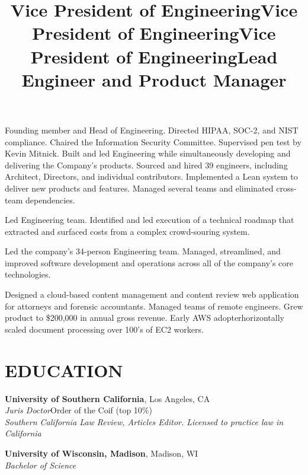 \documentclass[margin]{res}
\begin{document}
\begin{resume}
\title{\textbf{Vice President of Engineering}}
\begin{position}
\hspace*{.5cm}Founding member and Head of Engineering. Directed HIPAA, SOC-2, and NIST compliance. Chaired the Information Security Committee. Supervised pen test by Kevin Mitnick. Built and led Engineering while simultaneously developing and delivering the Company's products. Sourced and hired 39 engineers, including Architect, Directors, and individual contributors. Implemented a Lean system to deliver new products and features. Managed several teams and eliminated cross-team dependencies.
\end{position}

\title{\textbf{Vice President of Engineering}}
\begin{position}
\hspace*{.5cm}Led Engineering team. Identified and led execution of a technical roadmap that extracted and surfaced costs from a complex crowd-souring system.
\end{position}

\title{\textbf{Vice President of Engineering}}
\begin{position}
\hspace*{.5cm}Led the company's 34-person Engineering team. Managed, streamlined, and improved software development and operations across all of the company's core technologies.
\end{position}

\title{\textbf{Lead Engineer and Product Manager}}
\begin{position}
\hspace*{.5cm}Designed a cloud-based content management and content review web application for attorneys and forensic accountants.  Managed teams of remote engineers. Grew product to \$200,000 in annual gross revenue. Early AWS adopter\textemdash horizontally scaled document processing over 100's of EC2 workers.
\end{position}


\section{EDUCATION}

\textbf{University of Southern California}, Los Angeles, CA\\
{\sl Juris Doctor}\hfill Order of the Coif
(top 10\%)
\\
{\sl Southern California Law Review, Articles Editor. Licensed to practice law in California}

\textbf{University of Wisconsin, Madison}, Madison, WI\\
{\sl Bachelor of Science}

\end{resume}
\end{document}
